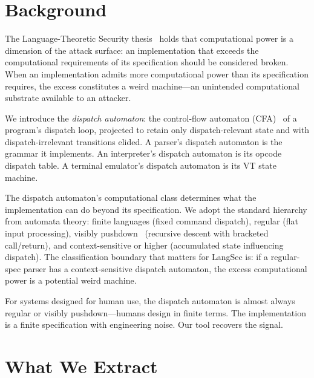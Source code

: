 \documentclass[conference]{./template/IEEEtran}
\begin{document}
\section{Background}

The Language-Theoretic Security thesis~\cite{sassaman2013security} holds that computational power is a dimension of the attack surface: an implementation that exceeds the computational requirements of its specification should be considered broken. When an implementation admits more computational power than its specification requires, the excess constitutes a weird machine---an unintended computational substrate available to an attacker.

We introduce the \emph{dispatch automaton}: the control-flow automaton (CFA)~\cite{henzinger2002lazy} of a program's dispatch loop, projected to retain only dispatch-relevant state and with dispatch-irrelevant transitions elided. A parser's dispatch automaton is the grammar it implements. An interpreter's dispatch automaton is its opcode dispatch table. A terminal emulator's dispatch automaton is its VT state machine.

The dispatch automaton's computational class determines what the implementation can do beyond its specification. We adopt the standard hierarchy from automata theory: finite languages (fixed command dispatch), regular (flat input processing), visibly pushdown~\cite{alur2004visibly} (recursive descent with bracketed call/return), and context-sensitive or higher (accumulated state influencing dispatch). The classification boundary that matters for LangSec is: if a regular-spec parser has a context-sensitive dispatch automaton, the excess computational power is a potential weird machine.

For systems designed for human use, the dispatch automaton is almost always regular or visibly pushdown---humans design in finite terms. The implementation is a finite specification with engineering noise. Our tool recovers the signal.

\section{What We Extract}
\end{document}
